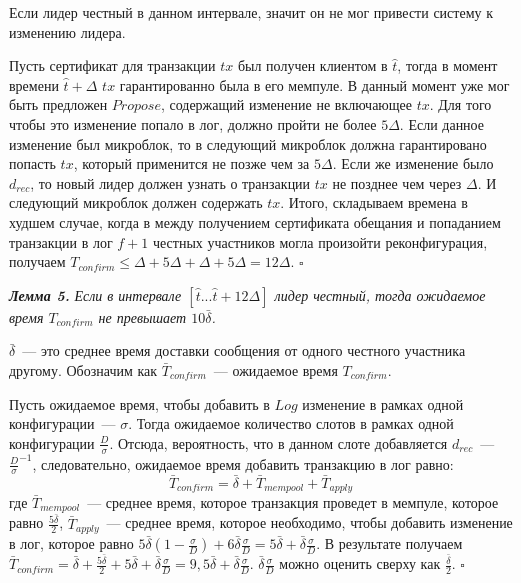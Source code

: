 Если лидер честный в данном интервале, значит он не мог привести систему к изменению лидера.

Пусть сертификат для транзакции $tx$ был получен клиентом в $\hat{t}$, тогда
в момент времени $\hat{t}+\Delta$ $tx$ гарантированно была в его мемпуле. В данный момент уже мог быть предложен $Propose$, содержащий изменение не включающее $tx$. Для того чтобы это изменение попало в лог, должно пройти не более $5\Delta$. Если данное изменение был микроблок, то в следующий микроблок должна гарантировано попасть $tx$, который применится не позже чем за $5\Delta$.
Если же изменение было $d_{rec}$, то новый лидер должен узнать о транзакции $tx$ не позднее чем через $\Delta$. И следующий микроблок должен содержать $tx$.
Итого, складываем времена в худшем случае, когда в между получением сертификата обещания и попаданием транзакции в лог $f+1$ честных участников могла произойти реконфигурация, получаем $T_{confirm} \le \Delta + 5\Delta+\Delta+5\Delta=12\Delta$. $\square$
\vspace{10pt}

\textbf{\textit{Лемма 5.}}  \textit{Если в интервале $[\hat{t}...\hat{t}+12\Delta]$ лидер честный, тогда ожидаемое время $T_{confirm}$ не превышает $10\bar{\delta}$.}

$\bar{\delta}$~--- это среднее время доставки сообщения от одного честного участника другому. Обозначим как $\bar{T}_{confirm}$~--- ожидаемое время  $T_{confirm}$.

Пусть ожидаемое время, чтобы добавить в $Log$ изменение в рамках одной конфигурации~--- $\sigma$.
Тогда ожидаемое количество слотов в рамках одной конфигурации $\frac{D}{\sigma}$. Отсюда, вероятность, что в данном слоте добавляется $d_{rec}$~--- $\frac{D}{\sigma}^{-1}$, следовательно, ожидаемое время добавить транзакцию в лог равно: 
$$\bar{T}_{confirm}=\bar{\delta}+\bar{T}_{mempool}+\bar{T}_{apply}$$
где $\bar{T}_{mempool}$~--- среднее время, которое транзакция проведет в мемпуле, которое равно $\frac{5\bar{\delta}}{2}$, $\bar{T}_{apply}$~--- среднее время, которое необходимо, чтобы добавить изменение в лог, которое равно $5\bar{\delta}(1-\frac{\sigma}{D})+6\bar{\delta}\frac{\sigma}{D}=5\bar{\delta}+\bar{\delta}\frac{\sigma}{D}$.
В результате получаем $\bar{T}_{confirm}=\bar{\delta}+\frac{5\bar{\delta}}{2}+5\bar{\delta}+\bar{\delta}\frac{\sigma}{D}=9,5\bar{\delta}+\bar{\delta}\frac{\sigma}{D}$. $\bar{\delta}\frac{\sigma}{D}$ можно оценить сверху как $\frac{\bar{\delta}}{2}$. $\square$
\vspace{10pt}

